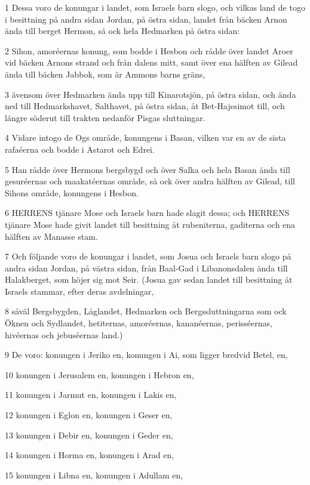 \par 1 Dessa voro de konungar i landet, som Israels barn slogo, och vilkas land de togo i besittning på andra sidan Jordan, på östra sidan, landet från bäcken Arnon ända till berget Hermon, så ock hela Hedmarken på östra sidan:
\par 2 Sihon, amoréernas konung, som bodde i Hesbon och rådde över landet Aroer vid bäcken Arnons strand och från dalens mitt, samt över ena hälften av Gilead ända till bäcken Jabbok, som är Ammons barns gräns,
\par 3 ävensom över Hedmarken ända upp till Kinarotsjön, på östra sidan, och ända ned till Hedmarkshavet, Salthavet, på östra sidan, åt Bet-Hajesimot till, och längre söderut till trakten nedanför Pisgas sluttningar.
\par 4 Vidare intogo de Ogs område, konungens i Basan, vilken var en av de sista rafaéerna och bodde i Astarot och Edrei.
\par 5 Han rådde över Hermons bergsbygd och över Salka och hela Basan ända till gesuréernas och maakatéernas område, så ock över andra hälften av Gilead, till Sihons område, konungens i Hesbon.
\par 6 HERRENS tjänare Mose och Israels barn hade slagit dessa; och HERRENS tjänare Mose hade givit landet till besittning åt rubeniterna, gaditerna och ena hälften av Manasse stam.
\par 7 Och följande voro de konungar i landet, som Josua och Israels barn slogo på andra sidan Jordan, på västra sidan, från Baal-Gad i Libanonsdalen ända till Halakberget, som höjer sig mot Seir. (Josua gav sedan landet till besittning åt Israels stammar, efter deras avdelningar,
\par 8 såväl Bergsbygden, Låglandet, Hedmarken och Bergssluttningarna som ock Öknen och Sydlandet, hetiternas, amoréernas, kananéernas, perisséernas, hivéernas och jebuséernas land.)
\par 9 De voro: konungen i Jeriko en, konungen i Ai, som ligger bredvid Betel, en,
\par 10 konungen i Jerusalem en, konungen i Hebron en,
\par 11 konungen i Jarmut en, konungen i Lakis en,
\par 12 konungen i Eglon en, konungen i Geser en,
\par 13 konungen i Debir en, konungen i Geder en,
\par 14 konungen i Horma en, konungen i Arad en,
\par 15 konungen i Libna en, konungen i Adullam en,

